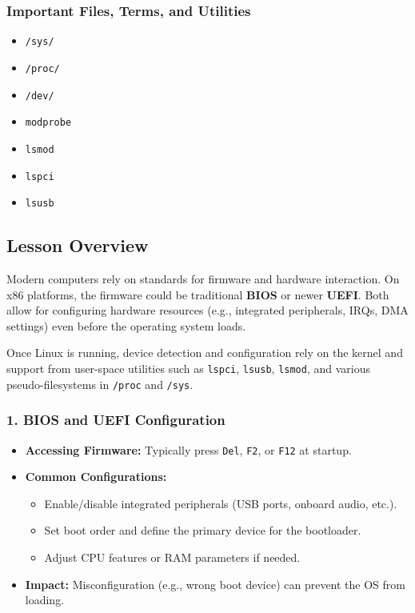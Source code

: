 \documentclass[12pt,a4paper]{report}
\begin{document}
\subsubsection*{Important Files, Terms, and Utilities}
\begin{itemize}
    \item \texttt{/sys/}
    \item \texttt{/proc/}
    \item \texttt{/dev/}
    \item \texttt{modprobe}
    \item \texttt{lsmod}
    \item \texttt{lspci}
    \item \texttt{lsusb}
\end{itemize}

\subsection*{Lesson Overview}
Modern computers rely on standards for firmware and hardware interaction. On x86 platforms, the firmware could be traditional \textbf{BIOS} or newer \textbf{UEFI}. Both allow for configuring hardware resources (e.g., integrated peripherals, IRQs, DMA settings) even before the operating system loads.

Once Linux is running, device detection and configuration rely on the kernel and support from user-space utilities such as \texttt{lspci}, \texttt{lsusb}, \texttt{lsmod}, and various pseudo-filesystems in \texttt{/proc} and \texttt{/sys}.

\subsubsection*{1. BIOS and UEFI Configuration}
\begin{itemize}
    \item \textbf{Accessing Firmware:} Typically press \texttt{Del}, \texttt{F2}, or \texttt{F12} at startup.
    \item \textbf{Common Configurations:}
    \begin{itemize}
      \item Enable/disable integrated peripherals (USB ports, onboard audio, etc.).
      \item Set boot order and define the primary device for the bootloader.
      \item Adjust CPU features or RAM parameters if needed.
    \end{itemize}
    \item \textbf{Impact:} Misconfiguration (e.g., wrong boot device) can prevent the OS from loading.
\end{itemize}
\end{document}
